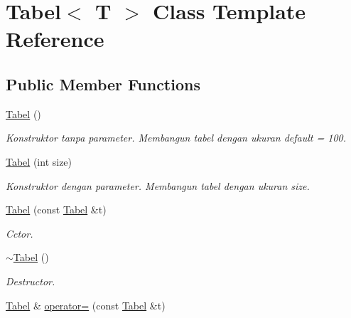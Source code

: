 \hypertarget{classTabel}{\section{Tabel$<$ T $>$ Class Template Reference}
\label{classTabel}
}
\subsection*{Public Member Functions}
\begin{DoxyCompactItemize}
\item 
\hypertarget{classTabel_a65a397d70f803c2a64dd7e8c110cc456}{\hyperlink{classTabel_a65a397d70f803c2a64dd7e8c110cc456}{Tabel} ()}\label{classTabel_a65a397d70f803c2a64dd7e8c110cc456}

\begin{DoxyCompactList}\small\item\em Konstruktor tanpa parameter. Membangun tabel dengan ukuran default = 100. \end{DoxyCompactList}\item 
\hyperlink{classTabel_a4ff8382411607449412db8d506d7c75a}{Tabel} (int size)
\begin{DoxyCompactList}\small\item\em Konstruktor dengan parameter. Membangun tabel dengan ukuran size. \end{DoxyCompactList}\item 
\hypertarget{classTabel_ae8cf138b74fa53694b171c8c3d594593}{\hyperlink{classTabel_ae8cf138b74fa53694b171c8c3d594593}{Tabel} (const \hyperlink{classTabel}{Tabel} \&t)}\label{classTabel_ae8cf138b74fa53694b171c8c3d594593}

\begin{DoxyCompactList}\small\item\em Cctor. \end{DoxyCompactList}\item 
\hypertarget{classTabel_a4ef722f9391380256623b03b498b350d}{\hyperlink{classTabel_a4ef722f9391380256623b03b498b350d}{$\sim$\-Tabel} ()}\label{classTabel_a4ef722f9391380256623b03b498b350d}

\begin{DoxyCompactList}\small\item\em Destructor. \end{DoxyCompactList}\item 
\hypertarget{classTabel_ad01f405d483ec7b879202040323685f5}{\hyperlink{classTabel}{Tabel} \& \hyperlink{classTabel_ad01f405d483ec7b879202040323685f5}{operator=} (const \hyperlink{classTabel}{Tabel} \&t)}\label{classTabel_ad01f405d483ec7b879202040323685f5}


\end{DoxyCompactItemize}
